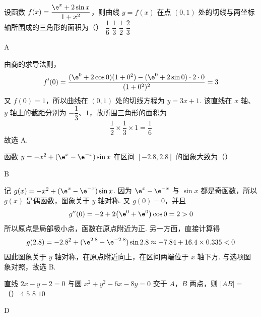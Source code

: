 \begin{problem}
设函数 \(f(x)=\dfrac{\e^x+2\sin x}{1+x^2}\)，则曲线 \(y=f(x)\) 在点 \((0,1)\) 处的切线与两坐标轴所围成的三角形的面积为（\quad）
\choices
    {\(\dfrac16\)}
    {\(\dfrac13\)}
    {\(\dfrac12\)}
    {\(\dfrac23\)}
\end{problem}

\begin{answer}
A
\end{answer}

\begin{solution}
由商的求导法则，
\[
f'(0)=\frac{(\e^0+2\cos 0)(1+0^2)-(\e^0+2\sin 0)\cdot 2\cdot 0}{(1+0^2)^2}=3
\]
又 \(f(0)=1\)，所以曲线在 \((0,1)\) 处的切线方程为 \(y=3x+1\). 该直线在 \(x\) 轴、\(y\) 轴上的截距分别为 \(-\dfrac13\)、\(1\)，故所围三角形的面积为
\[
\frac12\times\frac13\times1=\frac16
\]
故选 A.
\end{solution}

\begin{problem}
函数 \(y=-x^2+(\e^x-\e^{-x})\sin x\) 在区间 \([-2.8,2.8]\) 的图象大致为（\quad）
    {}
    {}
    {}
\end{problem}

\begin{answer}
B
\end{answer}

\begin{solution}
记 \(g(x)=-x^2+(\e^x-\e^{-x})\sin x\). 因为 \(\e^x-\e^{-x}\) 与 \(\sin x\) 都是奇函数，所以 \(g(x)\) 是偶函数，图象关于 \(y\) 轴对称. 又 \(g(0)=0\)，并且
\[
g''(0)=-2+2\bigl(\e^0+\e^0\bigr)\cos0=2>0
\]
所以原点是局部极小点，函数在原点附近为正. 另一方面，直接计算得
\[
g(2.8)=-2.8^2+(\e^{2.8}-\e^{-2.8})\sin2.8
\approx-7.84+16.4\times0.335<0
\]
因此图象关于 \(y\) 轴对称，在原点附近向上，在区间两端位于 \(x\) 轴下方. 与选项图象对照，故选 B.
\end{solution}

\begin{problem}
直线 \(2x-y-2=0\) 与圆 \(x^2+y^2-6x-8y=0\) 交于 \(A\)，\(B\) 两点，则 \(|AB|=\)（\quad）
\choices
    {\(4\)}
    {\(5\)}
    {\(8\)}
    {\(10\)}
\end{problem}

\begin{answer}
D
\end{answer}

